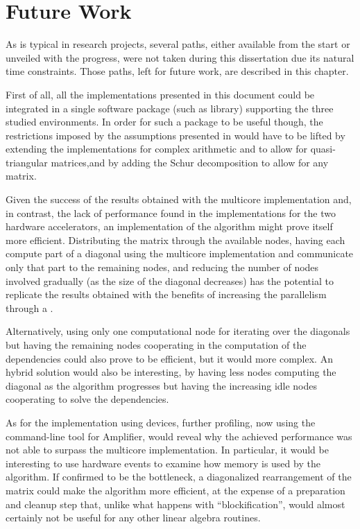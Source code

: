 \documentclass[../thesis]{subfiles}
\begin{document}
	\chapter{Future Work}
	\label{chp:futurework}

	As is typical in research projects, several paths, either available from the start or unveiled with the progress, were not taken during this dissertation due its natural time constraints. Those paths, left for future work, are described in this chapter.

	First of all, all the implementations presented in this document could be integrated in a single software package (such as \blas library) supporting the three studied environments. In order for such a package to be useful though, the restrictions imposed by the assumptions presented in \label{sec:multicore:column} would have to be lifted by extending the implementations for complex arithmetic and to allow for quasi-triangular matrices,and by adding the Schur decomposition to allow for any matrix.

	Given the success of the results obtained with the multicore implementation and, in contrast, the lack of performance found in the implementations for the two hardware accelerators, an \mpi implementation of the algorithm might prove itself more efficient. Distributing the matrix through the available nodes, having each compute part of a diagonal using the multicore implementation and communicate only that part to the remaining nodes, and reducing the number of nodes involved gradually (as the size of the diagonal decreases) has the potential to replicate the results obtained with the benefits of increasing the parallelism through a \hetplat.

	Alternatively, using only one computational node for iterating over the diagonals but having the remaining nodes cooperating in the computation of the dependencies could also prove to be efficient, but it would more complex. An hybrid solution would also be interesting, by having less nodes computing the diagonal as the algorithm progresses but having the increasing idle nodes cooperating to solve the dependencies.

	As for the implementation using \intel\mic devices, further profiling, now using the command-line tool for \intel\vtune Amplifier, would reveal why the achieved performance was not able to surpass the multicore implementation. In particular, it would be interesting to use hardware events to examine how memory is used by the algorithm. If confirmed to be the bottleneck, a diagonalized rearrangement of the matrix could make the algorithm more efficient, at the expense of a preparation and cleanup step that, unlike what happens with ``blockification'', would almost certainly not be useful for any other linear algebra routines.
\end{document}
